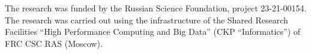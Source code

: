 



\vspace*{-22pt}


\Ack

\vspace*{-4pt}


\noindent
The research was funded by the Russian Science Foundation, project 23-21-00154. The research 
was carried out using the infrastructure of the Shared Research Facilities ``High Performance 
Computing and Big Data'' (CKP ``Informatics'') of FRC CSC RAS (Moscow).
  


